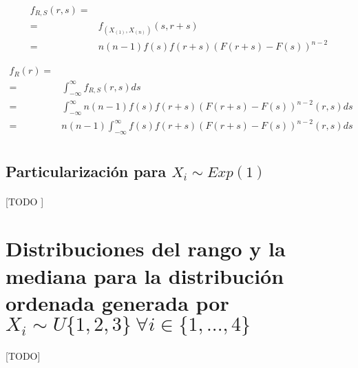 \documentclass{article}
\begin{document}
    \begin{align}
      f_{R,S}(r,s) =& \\
      =& f_{(X_{(1)}, X_{(n)})} (s,r+s) \\
      =& n(n-1)f(s)f(r+s)(F(r+s) - F(s))^{n-2}
    \end{align}

    \begin{align}
      f_{R} (r) =& \\
      =& \int_{-\infty}^{\infty} f_{R,S}(r,s) ds \\
      =& \int_{-\infty}^{\infty} n(n-1)f(s)f(r+s)(F(r+s) - F(s))^{n-2} (r,s) ds \\
      =& n(n-1)\int_{-\infty}^{\infty} f(s)f(r+s)(F(r+s) - F(s))^{n-2} (r,s) ds \\
    \end{align}
    \subsection{Particularización para $X_i \sim Exp(1)$}

      \paragraph{}
      [TODO ]

  \section{Distribuciones del rango y la mediana para la distribución ordenada generada por $X_i \sim U\{1,2,3\} \ \forall i  \in \{1,...,4\}$}
  \label{sec:e3}

    \paragraph{}
    [TODO]


  \nocite{prob2017}


  
  
\end{document}
